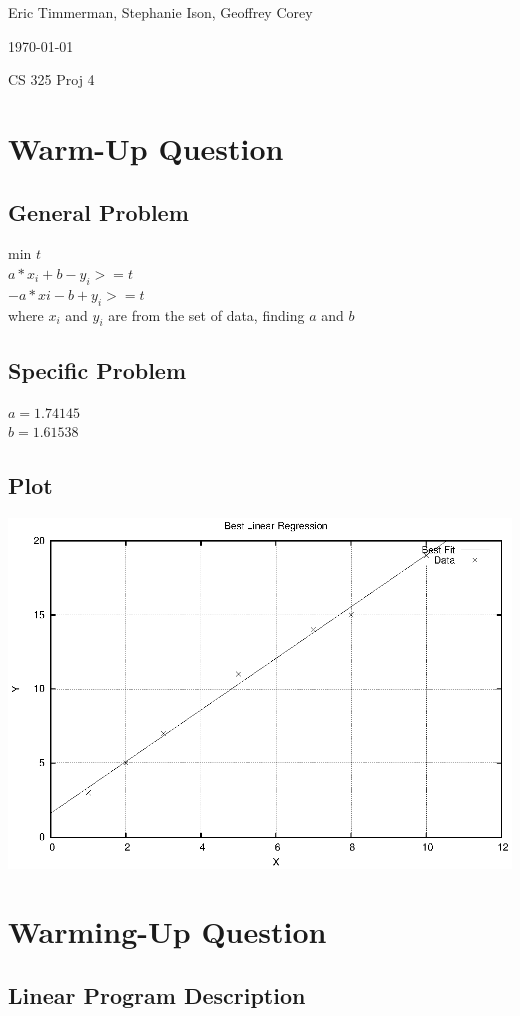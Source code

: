 \documentclass[letterpaper,10pt,titlepage]{article}
\def\name{Eric Timmerman, Stephanie Ison, Geoffrey Corey}
\begin{document}
\hfill \name

\hfill \today

\hfill CS 325 Proj 4

\section{Warm-Up Question}
\subsection*{General Problem}
min $t$\\
$a*x_{i} + b - y_{i} >= t$\\
$-a*x{i} - b + y_{i} >= t$\\
where $x_{i}$ and $y_{i}$ are from the set of data, finding $a$ and $b$
\subsection*{Specific Problem}
$a = 1.74145$\\
$b = 1.61538$

\subsection*{Plot}
\includegraphics[width=\textwidth]{warmup.eps}

\section{Warming-Up Question}
\subsection*{Linear Program Description}
\end{document}

